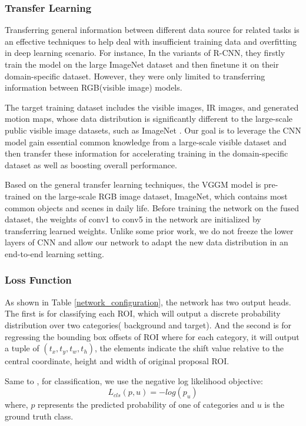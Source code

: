 \documentclass[journal]{IEEEtran}
\begin{document}
\subsubsection{Transfer Learning}
Transferring general information between different data source for related tasks is an effective techniques to help deal with insufficient training data and overfitting in deep learning scenario. For instance, In the variants of R-CNN, they firstly train the model on the large ImageNet \cite{RussakovskyImageNetChallenge} dataset and then finetune it on their domain-specific dataset. However, they were only limited to transferring information between RGB(visible image) models.

The target training dataset includes the visible images, IR images, and generated motion maps, whose data distribution is significantly different to the large-scale public visible image datasets, such as ImageNet \cite{RussakovskyImageNetChallenge}. Our goal is to leverage the CNN model gain essential common knowledge from a large-scale visible dataset and then transfer these information for accelerating training in the domain-specific dataset as well as boosting overall performance.

Based on the general transfer learning techniques, the VGGM model is pre-trained on the large-scale RGB image dataset, ImageNet, which contains most common objects and scenes in daily life. Before training the network on the fused dataset, the weights of conv1 to conv5 in the network are initialized by transferring learned weights. Unlike some prior work, we do not freeze the lower layers of CNN and allow our network to adapt the new data distribution in an end-to-end learning setting.
\subsubsection{Loss Function}
As shown in Table \ref{network_configuration}, the network has two output heads. The first is for classifying each ROI, which will output a discrete probability distribution over two categories( background and target). And the second is for regressing the bounding box offsets of ROI where for each category, it will output a tuple of $(t_x,t_y,t_w,t_h)$, the elements indicate the shift value relative to the central coordinate, height and width of original proposal ROI. 

Same to \cite{Girshick2016}, for classification, we use the negative log likelihood objective:
\begin{equation}
L_{cls}(p,u) = -log (p_u)
\end{equation}
where, $p$ represents the predicted probability of one of categories and $u$ is the ground truth class.
\end{document}

